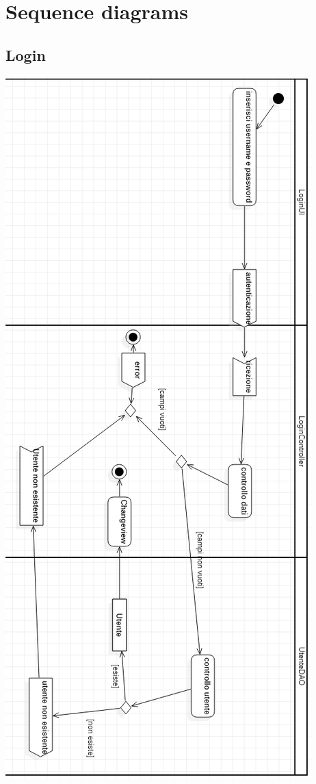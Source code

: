 \documentclass[11pt, oneside]{article}   	%
\begin{document}
\section{Sequence diagrams}
\subsection{Login}
    \begin{center}
    \includegraphics[scale=0.5]{images/loginactivity.png}
    \end{center}
    \pagebreak
\end{document}
